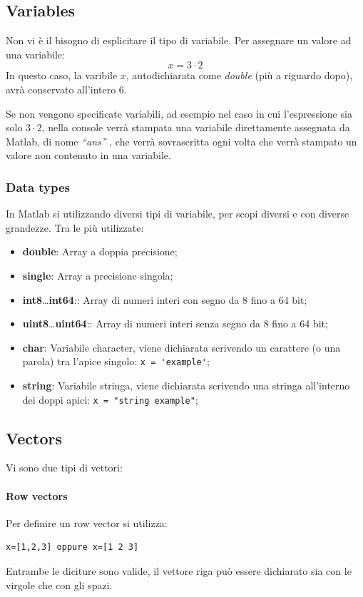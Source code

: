 %
\subsection{Variables}
Non vi è il bisogno di esplicitare il tipo di variabile. Per assegnare un valore ad una variabile:
\[
    x=3 \cdot 2
\]
In questo caso, la varibile $ x $, autodichiarata come \emph{double} (più a riguardo dopo), avrà conservato all'intero
$ 6 $.

Se non vengono specificate variabili, ad esempio nel caso in cui l'espressione sia solo $ 3 \cdot 2 $, nella console verrà
stampata una variabile direttamente assegnata da Matlab, di nome \emph{``ans''} , che verrà sovrascritta
ogni volta che verrà stampato un valore non contenuto in una variabile.

\subsubsection{Data types}
In Matlab si utilizzando diversi tipi di variabile, per scopi diversi e con diverse grandezze.
Tra le più utilizzate:
\begin{itemize}
    \item \textbf{double}: Array a doppia precisione;
    \item \textbf{single}: Array a precisione singola;
    \item \textbf{int8}\dots \textbf{int64}:: Array di numeri interi con segno da 8 fino a 64 bit;
    \item \textbf{uint8}\dots \textbf{uint64}:: Array di numeri interi senza segno da 8 fino a 64 bit;
    \item \textbf{char}: Variabile character, viene dichiarata scrivendo un carattere (o una parola) tra l'apice singolo: \verb|x = 'example'|;
    \item \textbf{string}: Variabile stringa, viene dichiarata scrivendo una stringa all'interno dei doppi apici: \verb|x = "string example"|;
\end{itemize}

%
\subsection{Vectors}
Vi sono due tipi di vettori:
\paragraph{Row vectors}
Per definire un row vector si utilizza:
\begin{verbatim}
x=[1,2,3] oppure x=[1 2 3]
\end{verbatim}
Entrambe le diciture sono valide, il vettore riga può essere dichiarato sia con le virgole che con gli spazi.


